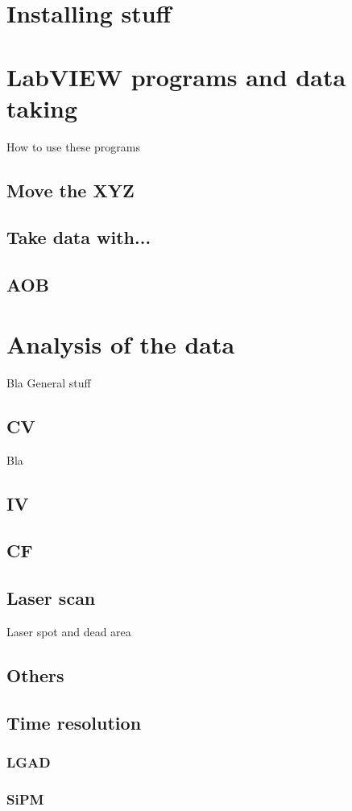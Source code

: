 \documentclass{article}
\begin{document}

\section{Installing stuff} 
\label{sec:Lab}


\section{LabVIEW programs and data taking}\label{sec:LabPrac}
How to use these programs


\subsection{Move the XYZ} 

\subsection{Take data with...} 

\subsection{AOB}

\section{Analysis of the data}\label{sec:Conf}
Bla
General stuff

\subsection{CV}
Bla

\subsection{IV}


\subsection{CF}

\subsection{Laser scan}
Laser spot and dead area

\subsection{Others}


\subsection{Time resolution} 
\subsubsection{LGAD}
\subsubsection{SiPM}
\end{document}
